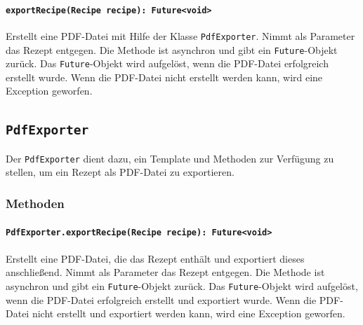 \documentclass{entwurfsheft}
\begin{document}
\paragraph{\texttt{exportRecipe(Recipe recipe): Future<void>}}
Erstellt eine PDF-Datei mit Hilfe der Klasse \texttt{PdfExporter}. Nimmt als Parameter das Rezept entgegen. Die Methode ist asynchron und gibt ein \texttt{Future}-Objekt zurück. Das \texttt{Future}-Objekt wird aufgelöst, wenn die PDF-Datei erfolgreich erstellt wurde. Wenn die PDF-Datei nicht erstellt werden kann, wird eine Exception geworfen.
\newpage
\subsection{\texttt{PdfExporter}}\label{sec:PdfExporter}
Der \texttt{PdfExporter} dient dazu, ein Template und Methoden zur Verfügung zu stellen, um ein Rezept als PDF-Datei zu exportieren.
\subsubsection*{Methoden}
\paragraph{\texttt{PdfExporter.exportRecipe(Recipe recipe): Future<void>}}
Erstellt eine PDF-Datei, die das Rezept enthält und exportiert dieses anschließend. Nimmt als Parameter das Rezept entgegen. Die Methode ist asynchron und gibt ein \texttt{Future}-Objekt zurück. Das \texttt{Future}-Objekt wird aufgelöst, wenn die PDF-Datei erfolgreich erstellt und exportiert wurde. Wenn die PDF-Datei nicht erstellt und exportiert werden kann, wird eine Exception geworfen.
\newpage
\end{document}
